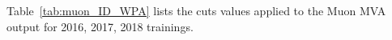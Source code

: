 %
%

Table~\ref{tab:muon_ID_WPA} lists the cuts values applied to the Muon MVA output for 2016, 2017, 2018 trainings.

